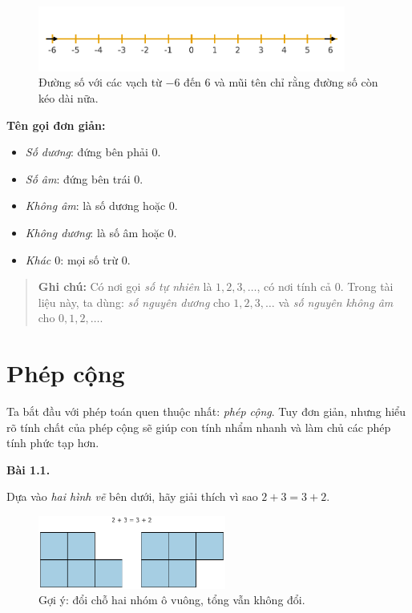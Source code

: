 \documentclass[14pt,a4paper]{extbook}
\newenvironment{problem}[1][]{
  \par\noindent\textbf{Bài #1.}\ \ignorespaces
}{\par}
\begin{document}
\begin{figure}[ht!]
  \centering
  \includegraphics[width=0.9\textwidth]{img/fig-numberline.pdf}
  \caption*{\small Đường số với các vạch từ $-6$ đến $6$ và mũi tên chỉ rằng
  đường số còn kéo dài nữa.}
\end{figure}

\noindent\textbf{Tên gọi đơn giản:}
\begin{itemize}
  \item \textit{Số dương}: đứng bên phải $0$.
  \item \textit{Số âm}: đứng bên trái $0$.
  \item \textit{Không âm}: là số dương hoặc $0$.
  \item \textit{Không dương}: là số âm hoặc $0$.
  \item \textit{Khác $0$}: mọi số trừ $0$.
\end{itemize}

\begin{quote}
\textbf{Ghi chú:} Có nơi gọi \emph{số tự nhiên} là $1,2,3,\ldots$,
có nơi tính cả $0$. Trong tài liệu này, ta dùng: \emph{số nguyên dương}
cho $1,2,3,\ldots$ và \emph{số nguyên không âm} cho $0,1,2,\ldots$.
\end{quote}


\section{Phép cộng}

Ta bắt đầu với phép toán quen thuộc nhất: \emph{phép cộng}.
Tuy đơn giản, nhưng hiểu rõ tính chất của phép cộng sẽ giúp con
tính nhẩm nhanh và làm chủ các phép tính phức tạp hơn.

\begin{problem}[1.1]
Dựa vào \emph{hai hình vẽ} bên dưới, hãy giải thích vì sao
$2+3=3+2$.

\begin{figure}[ht!]
  \centering
  \includegraphics[width=0.55\textwidth]{img/fig-prob1.1.pdf}
  \caption*{\small Gợi ý: đổi chỗ hai nhóm ô vuông, tổng vẫn không đổi.}
\end{figure}
\end{problem}
\end{document}
